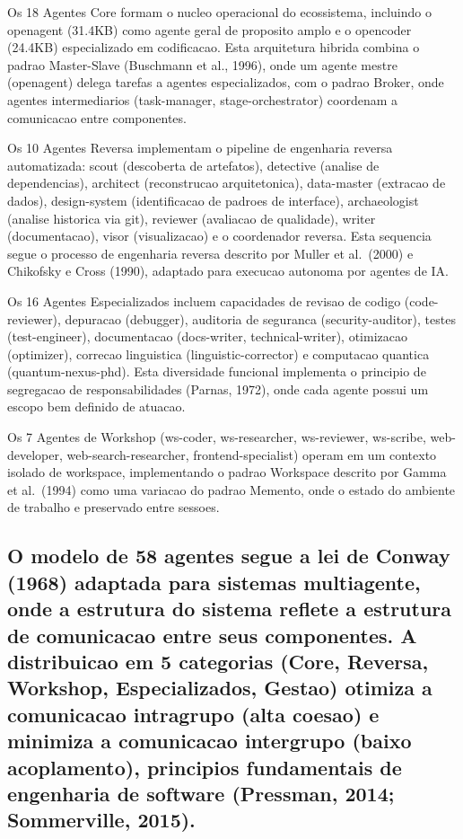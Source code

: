 \documentclass[
  12pt,
]{article}
\begin{document}
Os 18 Agentes Core formam o nucleo operacional do ecossistema, incluindo
o openagent (31.4KB) como agente geral de proposito amplo e o opencoder
(24.4KB) especializado em codificacao. Esta arquitetura hibrida combina
o padrao Master-Slave (Buschmann et al., 1996), onde um agente mestre
(openagent) delega tarefas a agentes especializados, com o padrao
Broker, onde agentes intermediarios (task-manager, stage-orchestrator)
coordenam a comunicacao entre componentes.

Os 10 Agentes Reversa implementam o pipeline de engenharia reversa
automatizada: scout (descoberta de artefatos), detective (analise de
dependencias), architect (reconstrucao arquitetonica), data-master
(extracao de dados), design-system (identificacao de padroes de
interface), archaeologist (analise historica via git), reviewer
(avaliacao de qualidade), writer (documentacao), visor (visualizacao) e
o coordenador reversa. Esta sequencia segue o processo de engenharia
reversa descrito por Muller et al.~(2000) e Chikofsky e Cross (1990),
adaptado para execucao autonoma por agentes de IA.

Os 16 Agentes Especializados incluem capacidades de revisao de codigo
(code-reviewer), depuracao (debugger), auditoria de seguranca
(security-auditor), testes (test-engineer), documentacao (docs-writer,
technical-writer), otimizacao (optimizer), correcao linguistica
(linguistic-corrector) e computacao quantica (quantum-nexus-phd). Esta
diversidade funcional implementa o principio de segregacao de
responsabilidades (Parnas, 1972), onde cada agente possui um escopo bem
definido de atuacao.

Os 7 Agentes de Workshop (ws-coder, ws-researcher, ws-reviewer,
ws-scribe, web-developer, web-search-researcher, frontend-specialist)
operam em um contexto isolado de workspace, implementando o padrao
Workspace descrito por Gamma et al.~(1994) como uma variacao do padrao
Memento, onde o estado do ambiente de trabalho e preservado entre
sessoes.

\subsection{O modelo de 58 agentes segue a lei de Conway (1968) adaptada
para sistemas multiagente, onde a estrutura do sistema reflete a
estrutura de comunicacao entre seus componentes. A distribuicao em 5
categorias (Core, Reversa, Workshop, Especializados, Gestao) otimiza a
comunicacao intragrupo (alta coesao) e minimiza a comunicacao intergrupo
(baixo acoplamento), principios fundamentais de engenharia de software
(Pressman, 2014; Sommerville,
2015).}\label{o-modelo-de-58-agentes-segue-a-lei-de-conway-1968-adaptada-para-sistemas-multiagente-onde-a-estrutura-do-sistema-reflete-a-estrutura-de-comunicacao-entre-seus-componentes.-a-distribuicao-em-5-categorias-core-reversa-workshop-especializados-gestao-otimiza-a-comunicacao-intragrupo-alta-coesao-e-minimiza-a-comunicacao-intergrupo-baixo-acoplamento-principios-fundamentais-de-engenharia-de-software-pressman-2014-sommerville-2015.}
\end{document}
